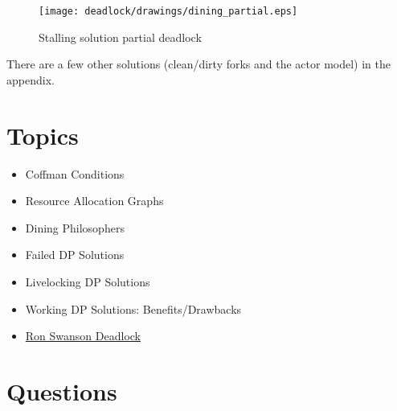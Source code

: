 \begin{figure}[H]
	\centering
	\texttt{[image: deadlock/drawings/dining\_partial.eps]}
	\caption{Stalling solution partial deadlock}
\end{figure}

There are a few other solutions (clean/dirty forks and the actor model) in the appendix.

\section{Topics}

\begin{itemize}
	\item Coffman Conditions
	\item Resource Allocation Graphs
	\item Dining Philosophers
	\item Failed DP Solutions
	\item Livelocking DP Solutions
	\item Working DP Solutions: Benefits/Drawbacks
	\item \href{http://adit.io/posts/2013-05-11-The-Dining-Philosophers-Problem-With-Ron-Swanson.html}{Ron Swanson Deadlock}
\end{itemize}

\section{Questions}


